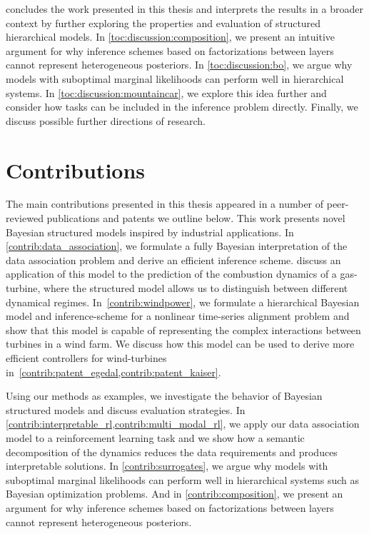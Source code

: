  concludes the work presented in this thesis and interprets the results in a broader context by further exploring the properties and evaluation of structured hierarchical models.
In \cref{toc:discussion:composition}, we present an intuitive argument for why inference schemes based on factorizations between layers cannot represent heterogeneous posteriors.
In \cref{toc:discussion:bo}, we argue why models with suboptimal marginal likelihoods can perform well in hierarchical systems.
In \cref{toc:discussion:mountaincar}, we explore this idea further and consider how tasks can be included in the inference problem directly.
Finally, we discuss possible further directions of research.


\section{Contributions}
The main contributions presented in this thesis appeared in a number of peer-reviewed publications and patents we outline below.
This work presents novel Bayesian structured models inspired by industrial applications.
In \cref{contrib:data_association}, we formulate a fully Bayesian interpretation of the data association problem and derive an efficient inference scheme.
 discuss an application of this model to the prediction of the combustion dynamics of a gas-turbine, where the structured model allows us to distinguish between different dynamical regimes.
In~\cref{contrib:windpower}, we formulate a hierarchical Bayesian model and inference-scheme for a nonlinear time-series alignment problem and show that this model is capable of representing the complex interactions between turbines in a wind farm.
We discuss how this model can be used to derive more efficient controllers for wind-turbines in~\cref{contrib:patent_egedal,contrib:patent_kaiser}.

Using our methods as examples, we investigate the behavior of Bayesian structured models and discuss evaluation strategies.
In \cref{contrib:interpretable_rl,contrib:multi_modal_rl}, we apply our data association model to a reinforcement learning task and we show how a semantic decomposition of the dynamics reduces the data requirements and produces interpretable solutions.
In \cref{contrib:surrogates}, we argue why models with suboptimal marginal likelihoods can perform well in hierarchical systems such as Bayesian optimization problems.
And in \cref{contrib:composition}, we present an argument for why inference schemes based on factorizations between layers cannot represent heterogeneous posteriors.


